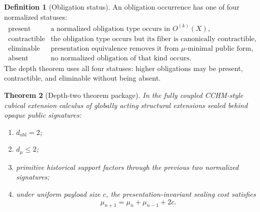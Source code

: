 \documentclass[11pt]{article}
\theoremstyle{plain}
\newtheorem{theorem}{Theorem}[section]
\theoremstyle{definition}
\newtheorem{definition}[theorem]{Definition}
\theoremstyle{remark}
\begin{document}
\begin{definition}[Obligation status]
An obligation occurrence has one of four normalized statuses:
\[
\begin{array}{ll}
\mathrm{present} & \text{a normalized obligation type occurs in }O^{(k)}(X),\\
\mathrm{contractible} & \text{the obligation type occurs but its fiber is canonically contractible},\\
\mathrm{eliminable} & \text{presentation equivalence removes it from }\mu\text{-minimal public form},\\
\mathrm{absent} & \text{no normalized obligation of that kind occurs.}
\end{array}
\]
The depth theorem uses all four statuses: higher obligations may be present, contractible, and eliminable without being absent.
\end{definition}

\begin{theorem}[Depth-two theorem package]
In the fully coupled CCHM-style cubical extension calculus of globally acting structural extensions sealed behind opaque public signatures:
\begin{enumerate}[leftmargin=*]
\item \(d_{\mathrm{obl}}=2\);
\item \(d_\mu\le 2\);
\item primitive historical support factors through the previous two normalized signatures;
\item under uniform payload size \(c\), the presentation-invariant sealing cost satisfies
\[
\mu_{n+1}=\mu_n+\mu_{n-1}+2c.
\]
\end{enumerate}
\end{theorem}
\end{document}
